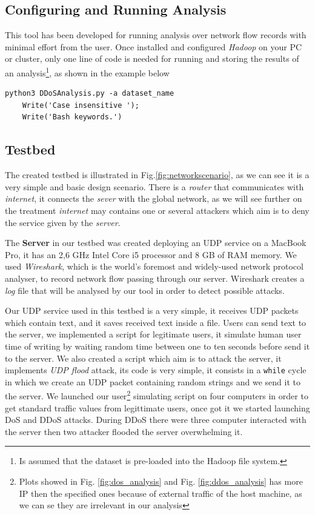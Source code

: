 \subsection{Configuring and Running Analysis}
This tool has been developed for running analysis over network flow records with minimal effort from the user. Once installed and configured \textit{Hadoop} on your PC or cluster, only one line of code is needed for running and storing the results of an analysis\footnote{Is assumed that the dataset is pre-loaded into the Hadoop file system.}, as shown in the example below

\begin{lstlisting}[firstline=1, lastline=1]
   python3 DDoSAnalysis.py -a dataset_name
	Write('Case insensitive '); 
	Write('Bash keywords.')
\end{lstlisting}

\subsection{Testbed} 
The created testbed is illustrated in Fig.\ref{fig:networkscenario}, as we can see it is a very simple and basic design scenario. There is a \textit{router} that communicates with \textit{internet},  it connects the \textit{sever} with the global network, as we will see further on the treatment \textit{internet} may contains one or several attackers which aim is to deny the service given by the \textit{server}. 

The \textbf{Server} in our testbed was created deploying an UDP service on a MacBook Pro, it has an 2,6 GHz Intel Core i5 processor and 8 GB of RAM memory. 
We used \textit{Wireshark}, which is the world's foremost and widely-used network protocol analyser, to record network flow passing through our server. 
Wireshark creates a \textit{log} file that will be analysed by our tool in order to detect possible attacks.

Our UDP service used in this testbed is a very simple, it receives UDP packets which contain text, and it saves received text inside a file.
Users can send text to the server, we implemented a script for legitimate users, it simulate human user time of writing by waiting random time between one to ten seconds before send it to the server.
We also created a script which aim is to attack the server, it implements \textit{UDP flood} attack, its code is very simple, it consists in a \texttt{while} cycle in which we create an UDP packet containing random strings and we send it to the server.
We launched our user\footnote{Plots showed in Fig. \ref{fig:dos_analysis} and Fig. \ref{fig:ddos_analysis} has more IP then the specified ones because of external traffic of the host machine, as we can se they are irrelevant in our analysis} simulating script on four computers in order to get standard traffic values from legittimate users, once got it we started launching DoS and DDoS attacks. During DDoS there were three computer interacted with the server then two attacker flooded the server overwhelming it.    

